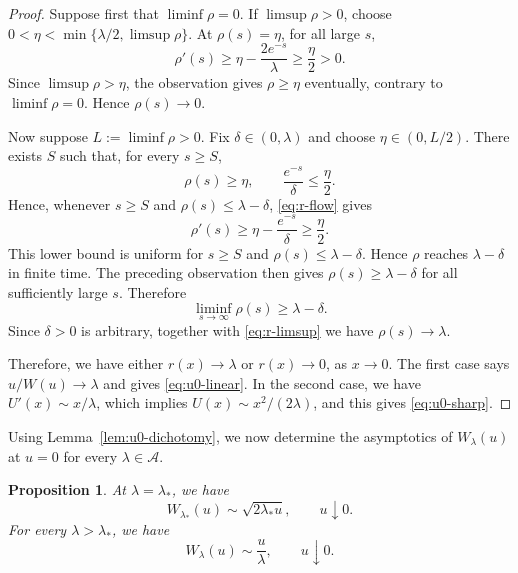 \documentclass[a4paper,fleqn]{cas-sc}
\numberwithin{equation}{section}
\theoremstyle{plain}
\newtheorem{proposition}[theorem]{Proposition}
\theoremstyle{definition}
\begin{document}
\begin{proof}
Suppose first that \(\liminf\rho=0\).  If \(\limsup\rho>0\), choose
\(0<\eta<\min\{\lambda/2,\limsup\rho\}\).  At \(\rho(s)=\eta\), for all large \(s\),
\[
 \rho'(s)\ge\eta-\frac{2e^{-s}}\lambda\ge\frac\eta2>0.
\]
Since \(\limsup\rho>\eta\), the observation gives \(\rho\ge\eta\) eventually,
contrary to \(\liminf\rho=0\).  Hence \(\rho(s)\to0\).

Now suppose \(L:=\liminf\rho>0\).  Fix \(\delta\in(0,\lambda)\) and choose
\(\eta\in(0,L/2)\).  There exists \(S\) such that, for every \(s\ge S\),
\[
 \rho(s)\ge\eta,
 \qquad
 \frac{e^{-s}}\delta\le\frac\eta2.
\]
Hence, whenever \(s\ge S\) and \(\rho(s)\le\lambda-\delta\),
\eqref{eq:r-flow} gives
\[
 \rho'(s)
 \ge\eta-\frac{e^{-s}}\delta
 \ge\frac\eta2.
\]
This lower bound is uniform for $s\ge S$ and
$\rho(s)\le\lambda-\delta$.  Hence $\rho$ reaches
$\lambda-\delta$ in finite time.  The preceding observation then gives
\(\rho(s)\ge\lambda-\delta\) for all sufficiently large \(s\).  Therefore
\[
 \liminf_{s\to\infty}\rho(s)\ge\lambda-\delta.
\]
Since \(\delta>0\) is arbitrary, together with \eqref{eq:r-limsup} we have
\(\rho(s)\to\lambda\).

Therefore, we have either \(r(x)\to \lambda\) or \(r(x)\to0\), as \(x\to 0\).  The first case says
\(u/W(u)\to \lambda\) and gives \eqref{eq:u0-linear}.  In the second case, we have
\(U'(x)\sim x/\lambda\), which implies
\(U(x)\sim x^2/(2\lambda)\), and this gives
\eqref{eq:u0-sharp}.
\end{proof}

Using Lemma~\ref{lem:u0-dichotomy}, we now determine the asymptotics of
$W_\lambda(u)$ at $u=0$ for every $\lambda\in\mathcal A$.

\begin{proposition}
\label{prop:critical-branches}
At \(\lambda = \lambda_*\), we have
\begin{equation}
 W_{\lambda_*}(u)\sim\sqrt{2\lambda_*u},
 \qquad u\downarrow0.
 \label{eq:critical-sharp-branch}
\end{equation}
For every \(\lambda>\lambda_*\), we have
\begin{equation}
 W_\lambda(u)\sim\frac u\lambda,
 \qquad u\downarrow0.
 \label{eq:supercritical-linear-branch}
\end{equation}
\end{proposition}
\end{document}
